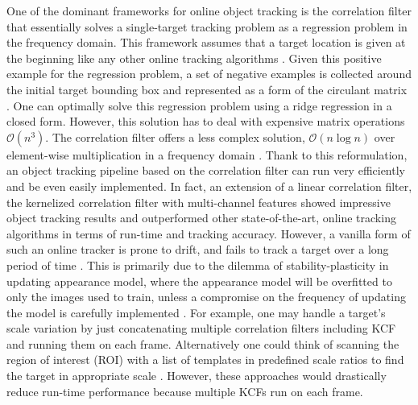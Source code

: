 \documentclass[10pt,twocolumn,letterpaper]{article}
\begin{document}
One of the dominant frameworks for online object tracking is the
correlation filter that essentially solves a single-target tracking
problem as a regression problem in the frequency domain. This
framework assumes that a target location is given at the beginning
like any other online tracking algorithms
\cite{smeulders2014survey}. Given this positive example for the
regression problem, a set of negative examples is collected around the
initial target bounding box and represented as a form of the circulant
matrix \cite{henriques2015high}. One can optimally solve this
regression problem using a ridge regression in a closed form. However,
this solution has to deal with expensive matrix operations
$\mathcal{O}(n^{3})$. The correlation filter offers a less complex
solution, $\mathcal{O}(n\log n)$ over element-wise multiplication in a
frequency domain \cite{bolme2010visual,henriques2015high}. Thank to
this reformulation, an object tracking pipeline based on the
correlation filter can run very efficiently and be even easily
implemented. In fact, an extension of a linear correlation filter, the
kernelized correlation filter with multi-channel features
\cite{henriques2015high} showed impressive object tracking results and
outperformed other state-of-the-art, online tracking algorithms in
terms of run-time and tracking accuracy. However, a vanilla form of
such an online tracker is prone to drift, and fails to track a target
over a long period of time \cite{henriques2015high}. This is primarily
due to the dilemma of stability-plasticity in updating appearance
model, where the appearance model will be overfitted to only the
images used to train, unless a compromise on the frequency of updating
the model is carefully implemented \cite{santner2010prost}. For
example, one may handle a target's scale variation by just
concatenating multiple correlation filters including KCF and running
them on each frame. Alternatively one could think of scanning the
region of interest (ROI) with a list of templates in predefined scale
ratios to find the target in appropriate scale
\cite{henriques2015high,tang2015multi,ma2015long,bibi2015multi,li2014scale}. However,
these approaches would drastically reduce run-time performance because
multiple KCFs run on each frame. 
\end{document}
